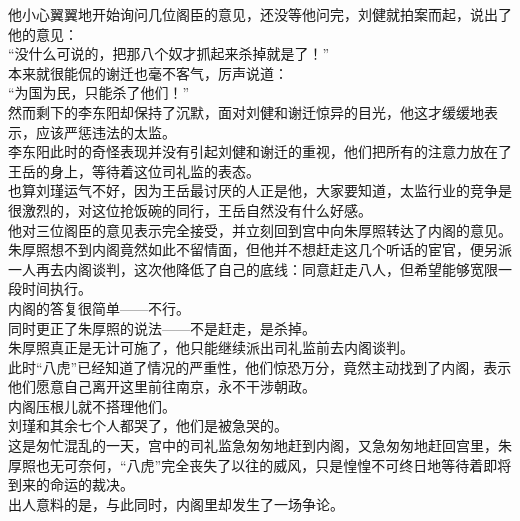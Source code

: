 \begin{multicols}{\theparacolNo}
他小心翼翼地开始询问几位阁臣的意见，还没等他问完，刘健就拍案而起，说出了他的意见：\\

“没什么可说的，把那八个奴才抓起来杀掉就是了！”\\

本来就很能侃的谢迁也毫不客气，厉声说道：\\

“为国为民，只能杀了他们！”\\

然而剩下的李东阳却保持了沉默，面对刘健和谢迁惊异的目光，他这才缓缓地表示，应该严惩违法的太监。\\

李东阳此时的奇怪表现并没有引起刘健和谢迁的重视，他们把所有的注意力放在了王岳的身上，等待着这位司礼监的表态。\\

也算刘瑾运气不好，因为王岳最讨厌的人正是他，大家要知道，太监行业的竞争是很激烈的，对这位抢饭碗的同行，王岳自然没有什么好感。\\

他对三位阁臣的意见表示完全接受，并立刻回到宫中向朱厚照转达了内阁的意见。\\

朱厚照想不到内阁竟然如此不留情面，但他并不想赶走这几个听话的宦官，便另派一人再去内阁谈判，这次他降低了自己的底线：同意赶走八人，但希望能够宽限一段时间执行。\\

内阁的答复很简单——不行。\\

同时更正了朱厚照的说法——不是赶走，是杀掉。\\

朱厚照真正是无计可施了，他只能继续派出司礼监前去内阁谈判。\\

此时“八虎”已经知道了情况的严重性，他们惊恐万分，竟然主动找到了内阁，表示他们愿意自己离开这里前往南京，永不干涉朝政。\\

内阁压根儿就不搭理他们。\\

刘瑾和其余七个人都哭了，他们是被急哭的。\\

这是匆忙混乱的一天，宫中的司礼监急匆匆地赶到内阁，又急匆匆地赶回宫里，朱厚照也无可奈何，“八虎”完全丧失了以往的威风，只是惶惶不可终日地等待着即将到来的命运的裁决。\\

出人意料的是，与此同时，内阁里却发生了一场争论。\\


\end{multicols}
